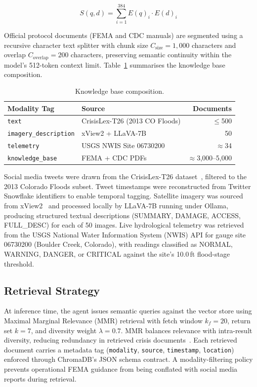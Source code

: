 \documentclass[conference]{IEEEtran}
\begin{document}
\begin{equation}
  S(q,d) = \sum_{i=1}^{384} E(q)_i \cdot E(d)_i
  \label{eq:cosine}
\end{equation}

Official protocol documents (FEMA and CDC manuals) are segmented using a
recursive character text splitter with chunk size $C_{\text{size}}{=}1{,}000$
characters and overlap $C_{\text{overlap}}{=}200$ characters, preserving
semantic continuity within the model's 512-token context limit.
Table~\ref{tab:kb} summarises the knowledge base composition.

\begin{table}[ht]
\centering
\caption{Knowledge base composition.}
\label{tab:kb}
\renewcommand{\arraystretch}{1.2}
\begin{tabular}{@{}llr@{}}
\toprule
\textbf{Modality Tag} & \textbf{Source} & \textbf{Documents} \\ \midrule
\texttt{text}                & CrisisLex-T26 (2013 CO Floods) & $\leq$500 \\
\texttt{imagery\_description}& xView2 + LLaVA-7B              & 50 \\
\texttt{telemetry}           & USGS NWIS Site 06730200        & $\approx$34 \\
\texttt{knowledge\_base}     & FEMA + CDC PDFs                & $\approx$3{,}000--5{,}000 \\ \bottomrule
\end{tabular}
\end{table}

Social media tweets were drawn from the CrisisLex-T26
dataset~\cite{b21}, filtered to the 2013 Colorado Floods subset. Tweet
timestamps were reconstructed from Twitter Snowflake identifiers to enable
temporal tagging. Satellite imagery was sourced from xView2~\cite{b22} and
processed locally by LLaVA-7B running under Ollama, producing structured
textual descriptions (SUMMARY, DAMAGE, ACCESS, FULL\_DESC) for each of 50
images. Live hydrological telemetry was retrieved from the USGS National Water
Information System (NWIS) API for gauge site 06730200 (Boulder Creek, Colorado),
with readings classified as NORMAL, WARNING, DANGER, or CRITICAL against the
site's 10.0\,ft flood-stage threshold.

\subsection{Retrieval Strategy}

At inference time, the agent issues semantic queries against the vector store
using Maximal Marginal Relevance (MMR) retrieval with fetch window
$k_f{=}20$, return set $k{=}7$, and diversity weight $\lambda{=}0.7$.
MMR balances relevance with intra-result diversity, reducing redundancy in
retrieved crisis documents~\cite{b25}. Each retrieved document carries a
metadata tag (\texttt{modality}, \texttt{source}, \texttt{timestamp},
\texttt{location}) enforced through ChromaDB's JSON schema contract. A
modality-filtering policy prevents operational FEMA guidance from being
conflated with social media reports during retrieval.
\end{document}
